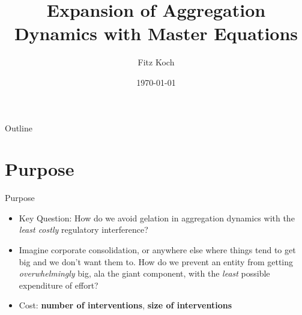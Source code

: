 \documentclass{beamer}
\title{Expansion of Aggregation Dynamics with Master Equations}
\author{Fitz Koch}
\date{\today}
\begin{document}
\begin{frame}
    \titlepage
\end{frame}

\begin{frame}{Outline}
    \tableofcontents
\end{frame}

\section{Purpose}
\begin{frame}{Purpose}
    \begin{itemize}
        \item Key Question: How do we avoid gelation in aggregation dynamics with the \textit{least costly} regulatory interference?
        \item Imagine corporate consolidation, or anywhere else where things tend to get big and we don't want them to. How do we prevent an entity from getting \textit{overwhelmingly} big, ala the giant component, with the \textit{least} possible expenditure of effort?
        \item Cost:  \textbf{number of interventions}, \textbf{size of interventions}
    \end{itemize}
\end{frame}
\end{document}
